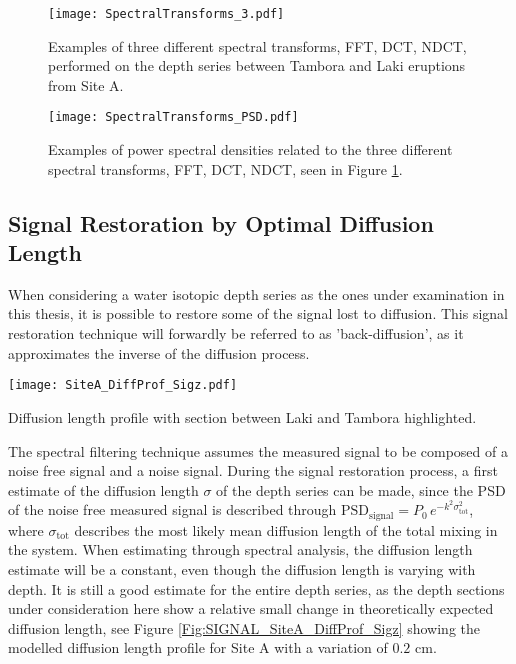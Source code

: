 \documentclass[../../CompleteThesis2/Complete_2ndDraft]{subfiles}
\begin{document}
	
	


\begin{figure}[h]
	\centering
	\texttt{[image: SpectralTransforms\_3.pdf]}
	\caption[FFT, DCT, NDCT, Site A]{\small Examples of three different spectral transforms, FFT, DCT, NDCT, performed on the depth series between Tambora and Laki eruptions from Site A.}
	\label{fig:SpectralTransforms_3}
\end{figure}

\begin{figure}[h]
	\centering
	\texttt{[image: SpectralTransforms\_PSD.pdf]}
	\caption[FFT, DCT, NDCT PSDs, Site A]{\small Examples of power spectral densities related to the three different spectral transforms, FFT, DCT, NDCT, seen in Figure \ref{fig:SpectralTransforms_3}.}
	\label{fig:SpectralTransforms_PSD}
\end{figure}







\subsection[Signal Restoration][Signal Restoration]{Signal Restoration by Optimal Diffusion Length}
\label{Subsec:SignalAnalysis_BackDiffusion_SignalRestoration}
When considering a water isotopic depth series as the ones under examination in this thesis, it is possible to restore some of the signal lost to diffusion. This signal restoration technique will forwardly be referred to as 'back-diffusion', as it approximates the inverse of the diffusion process.
\begin{marginfigure}
	\centering
	\texttt{[image: SiteA\_DiffProf\_Sigz.pdf]}
	\caption[Diffusion length profile, LT]{\footnotesize Diffusion length profile with section between Laki and Tambora highlighted.}
	\label{Fig:SIGNAL_SiteA_DiffProf_Sigz}
\end{marginfigure}
The spectral filtering technique assumes the measured signal to be composed of a noise free signal and a noise signal. During the signal restoration process, a first estimate of the diffusion length $\sigma$ of the depth series can be made, since the PSD of the noise free measured signal is described through $\text{PSD}_{\text{signal}}=P_0\,e^{-k^2\sigma_{\text{tot}}^2}$, where $\sigma_{\text{tot}}$ describes the most likely mean diffusion length of the total mixing in the system. When estimating through spectral analysis, the diffusion length estimate will be a constant, even though the diffusion length is varying with depth. It is still a good estimate for the entire depth series, as the depth sections under consideration here show a relative small change in theoretically expected diffusion length, see Figure \ref{Fig:SIGNAL_SiteA_DiffProf_Sigz} showing the modelled diffusion length profile for Site A with a variation of $0.2$ cm. 
\end{document}
